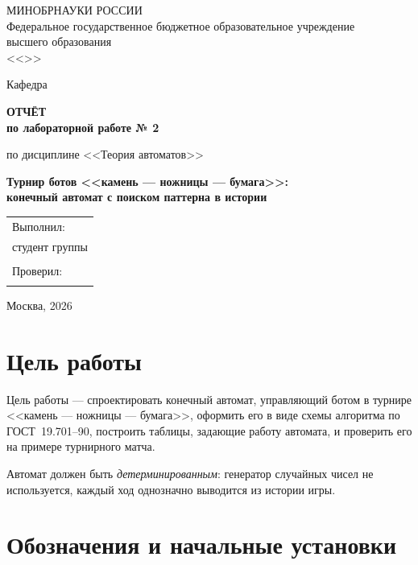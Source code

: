 \documentclass[a4paper,14pt]{extarticle}
\newcommand{\university}{МИНОБРНАУКИ РОССИИ\\[2pt]
Федеральное государственное бюджетное образовательное учреждение\\
высшего образования\\[2pt]
<<\underline{\hspace{9cm}}>>}
\newcommand{\department}{Кафедра \underline{\hspace{7cm}}}
\newcommand{\discipline}{Теория автоматов}
\newcommand{\studentgroup}{\underline{\hspace{3.2cm}}}
\newcommand{\studentname}{\underline{\hspace{6cm}}}
\newcommand{\teacher}{\underline{\hspace{6cm}}}
\newcommand{\labtitle}{Турнир ботов <<камень --- ножницы --- бумага>>:\\[2pt]
конечный автомат с поиском паттерна в истории}
\newcommand{\labnumber}{2}
\newcommand{\cityyear}{Москва, 2026}
\begin{document}
\begin{titlepage}
\centering
{\small\university\par}
\vspace{1.5cm}
{\large\department\par}
\vspace{2.5cm}
{\Large\bfseries ОТЧЁТ\\[4pt] по лабораторной работе № \labnumber\par}
\vspace{0.6cm}
{\large по дисциплине <<\discipline>>\par}
\vspace{1.5cm}
{\Large\bfseries\labtitle\par}
\vfill
\begin{flushright}
\begin{tabular}{@{}l@{}}
Выполнил:\\
студент группы \studentgroup\\
\studentname\\[10pt]
Проверил:\\
\teacher\\
\end{tabular}
\end{flushright}
\vfill
{\cityyear\par}
\end{titlepage}

\tableofcontents
\newpage

\section{Цель работы}

Цель работы --- спроектировать конечный автомат, управляющий ботом в турнире
<<камень --- ножницы --- бумага>>, оформить его в виде схемы алгоритма по
ГОСТ~19.701--90, построить таблицы, задающие работу автомата, и проверить его
на примере турнирного матча.

Автомат должен быть \emph{детерминированным}: генератор случайных чисел не
используется, каждый ход однозначно выводится из истории игры.

\section{Обозначения и начальные установки}
\end{document}
